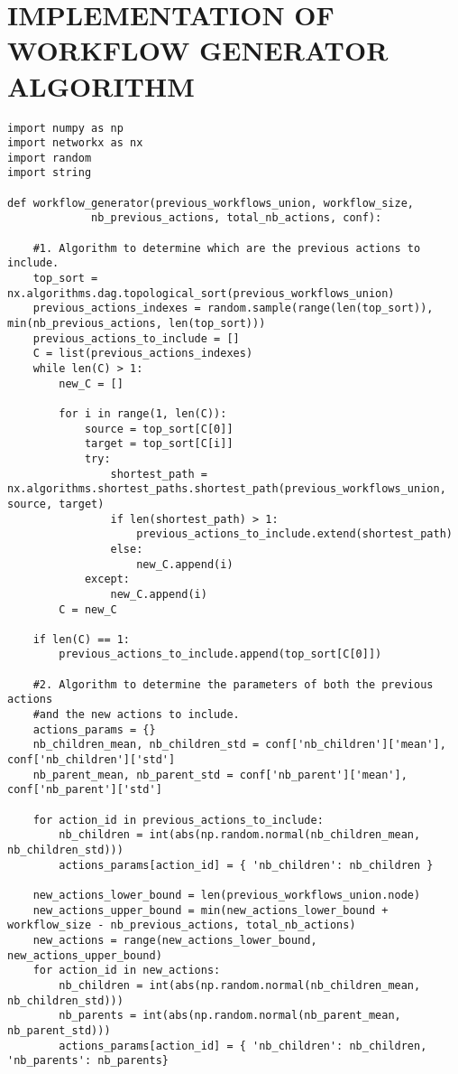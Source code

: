 \chapter{IMPLEMENTATION OF WORKFLOW GENERATOR ALGORITHM}
\newpage
\label{app:workflow_generator_implementation}
\begin{singlespace}
\begin{lstlisting}
import numpy as np
import networkx as nx
import random
import string

def workflow_generator(previous_workflows_union, workflow_size,
             nb_previous_actions, total_nb_actions, conf):
           
    #1. Algorithm to determine which are the previous actions to include.
    top_sort = nx.algorithms.dag.topological_sort(previous_workflows_union)
    previous_actions_indexes = random.sample(range(len(top_sort)), min(nb_previous_actions, len(top_sort)))
    previous_actions_to_include = []
    C = list(previous_actions_indexes)
    while len(C) > 1:
        new_C = []
        
        for i in range(1, len(C)):
            source = top_sort[C[0]]
            target = top_sort[C[i]]
            try:
                shortest_path = nx.algorithms.shortest_paths.shortest_path(previous_workflows_union, source, target)
                if len(shortest_path) > 1:
                    previous_actions_to_include.extend(shortest_path)
                else:
                    new_C.append(i)
            except:
                new_C.append(i)
        C = new_C
    
    if len(C) == 1:
        previous_actions_to_include.append(top_sort[C[0]])
    
    #2. Algorithm to determine the parameters of both the previous actions
    #and the new actions to include.
    actions_params = {}
    nb_children_mean, nb_children_std = conf['nb_children']['mean'], conf['nb_children']['std']
    nb_parent_mean, nb_parent_std = conf['nb_parent']['mean'], conf['nb_parent']['std']
    
    for action_id in previous_actions_to_include:
        nb_children = int(abs(np.random.normal(nb_children_mean, nb_children_std)))
        actions_params[action_id] = { 'nb_children': nb_children }
    
    new_actions_lower_bound = len(previous_workflows_union.node)
    new_actions_upper_bound = min(new_actions_lower_bound + workflow_size - nb_previous_actions, total_nb_actions)
    new_actions = range(new_actions_lower_bound, new_actions_upper_bound)
    for action_id in new_actions:
        nb_children = int(abs(np.random.normal(nb_children_mean, nb_children_std)))
        nb_parents = int(abs(np.random.normal(nb_parent_mean, nb_parent_std)))
        actions_params[action_id] = { 'nb_children': nb_children, 'nb_parents': nb_parents}
        

\end{lstlisting}
\end{singlespace}
